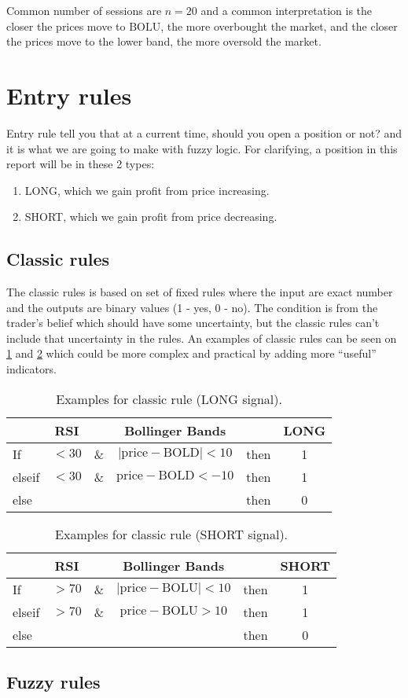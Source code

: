 \documentclass{article}
\begin{document}
Common number of sessions are $n = 20$ and a common interpretation is the closer the prices move to $\text{BOLU}$, 
the more overbought the market, and the closer the prices move to the lower band, the more oversold the market.

\section*{Entry rules}
Entry rule tell you that at a current time, should you open a position or not? and it is what we are going to make with fuzzy logic.
For clarifying, a position in this report will be in these 2 types:
\begin{enumerate}
    \item LONG, which we gain profit from price increasing.
    \item SHORT, which we gain profit from price decreasing.
\end{enumerate}

\subsection*{Classic rules}
The classic rules is based on set of fixed rules where the input are exact number and the outputs are binary values (1 - yes, 0 - no). 
The condition is from the trader's belief which should have some uncertainty, but the classic rules can't include that uncertainty in the rules.
An examples of classic rules can be seen on \cref*{table:1} and \cref*{table:2} which could be more complex and practical by adding more ``useful'' indicators.
\begin{table}[htp]
	\centering
	\begin{tabular}{l c c c c c}
		\toprule
        {} & {RSI} & {} & {Bollinger Bands} & {} & {LONG} \\ 
        \midrule
        If & $<30$ & \& & $|\text{price} - \text{BOLD}| < 10$ & then & 1 \\
        elseif & $<30$ & \& & $\text{price} - \text{BOLD} < -10$ & then & 1 \\
        else &  &  &  & then & 0 \\
        \bottomrule
    \end{tabular} 
    \caption{Examples for classic rule (LONG signal).}
	\label{table:1}
\end{table}
\begin{table}[htp]
	\centering
	\begin{tabular}{l c c c c c}
		\toprule
        {} & {RSI} & {} & {Bollinger Bands} & {} & {SHORT} \\ 
        \midrule
        If & $ >70$ & \& & $|\text{price} - \text{BOLU}| < 10$ & then & 1 \\
        elseif & $ >70$ & \& & $\text{price} - \text{BOLU} > 10$ & then & 1 \\
        else &  &  &  & then & 0 \\
        \bottomrule
    \end{tabular} 
    \caption{Examples for classic rule (SHORT signal).}
	\label{table:2}
\end{table}

\subsection*{Fuzzy rules}

\newpage
\printbibliography
\end{document}
